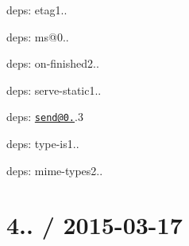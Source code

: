 {\begin{DoxyItemize}
\begin{DoxyItemize}
\item deps\+: etag1..
\item deps\+: ms@0..
\item deps\+: on-\/finished2..
\end{DoxyItemize}
\item deps\+: serve-\/static1..
\begin{DoxyItemize}
\item deps\+: \href{mailto:send@0.12}{\tt send@0.}.3
\end{DoxyItemize}
\item deps\+: type-\/is1..
\begin{DoxyItemize}
\item deps\+: mime-\/types2..
\end{DoxyItemize}
\end{DoxyItemize}}

{\ttfamily \section*{4.. / 2015-\/03-\/17 }}

{\ttfamily }

